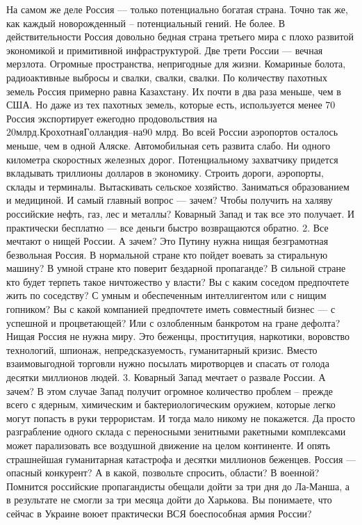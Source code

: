 На самом же деле Россия — только потенциально
богатая страна. Точно так же, как каждый новорожденный – потенциальный гений.
Не более. В действительности Россия довольно бедная страна третьего мира с
плохо развитой экономикой и примитивной инфраструктурой.
Две трети России — вечная мерзлота. Огромные
пространства, непригодные для жизни. Комариные болота, радиоактивные выбросы и
свалки, свалки, свалки.
По количеству пахотных земель Россия примерно
равна Казахстану. Их почти в два раза меньше, чем в США. Но даже из тех
пахотных земель, которые есть, используется менее 70%
Россия экспортирует ежегодно продовольствия на $20 млрд. Крохотная Голландия –
на $90 млрд. Во всей России аэропортов осталось меньше, чем в одной Аляске.
Автомобильная сеть развита слабо. Ни одного километра скоростных железных
дорог. Потенциальному захватчику придется вкладывать триллионы долларов в
экономику. Строить дороги, аэропорты, склады и терминалы. Вытаскивать сельское
хозяйство. Заниматься образованием и медициной. И самый главный вопрос — зачем?
Чтобы получить на халяву российские нефть, газ, лес и металлы? Коварный Запад и
так все это получает. И практически бесплатно — все деньги быстро возвращаются
обратно.
2. Все мечтают о нищей России. А зачем? Это
Путину нужна нищая безграмотная безвольная Россия. В нормальной стране кто
пойдет воевать за стиральную машину? В умной стране кто поверит бездарной пропаганде?
В сильной стране кто будет терпеть такое ничтожество у власти? Вы с каким
соседом предпочтете жить по соседству? С умным и обеспеченным интеллигентом или
с нищим гопником? Вы с какой компанией предпочтете иметь совместный бизнес — с
успешной и процветающей? Или с озлобленным банкротом на гране дефолта? Нищая Россия не нужна миру. Это беженцы,
проституция, наркотики, воровство технологий, шпионаж, непредсказуемость,
гуманитарный кризис. Вместо взаимовыгодной торговли нужно посылать миротворцев
и спасать от голода десятки миллионов людей.
3. Коварный Запад мечтает о развале России. А
зачем? В этом случае Запад получит огромное количество проблем – прежде всего с
ядерным, химическим и бактериологическим оружием, которые легко могут попасть в
руки террористам. И тогда мало никому не покажется. Да просто разграбление
одного склада с переносными зенитными ракетными комплексами может парализовать
все воздушной движение на целом континенте. И опять страшнейшая гуманитарная
катастрофа и десятки миллионов беженцев. Россия — опасный конкурент? А в какой,
позвольте спросить, области? В военной? Помнится российские пропагандисты
обещали дойти за три дня до Ла-Манша, а в результате не смогли за три месяца
дойти до Харькова. Вы понимаете, что сейчас в Украине воюет практически ВСЯ
боеспособная армия России? 

